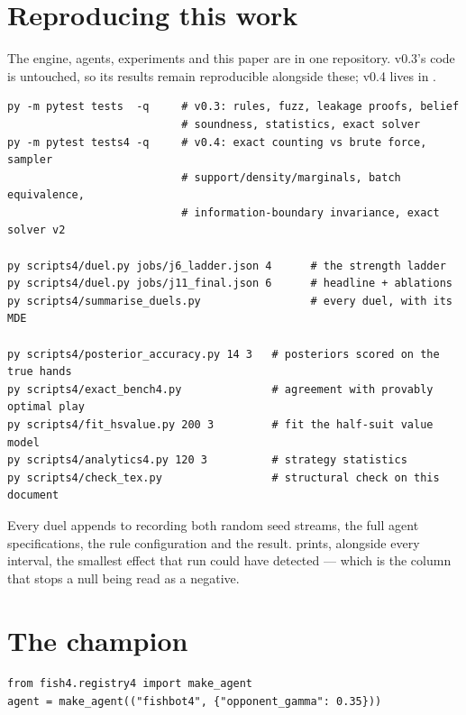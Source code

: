 \documentclass[11pt,a4paper]{article}
\begin{document}
\appendix

\section{Reproducing this work}
\label{app:repro}

The engine, agents, experiments and this paper are in one repository. v0.3's
code is untouched, so its results remain reproducible alongside these; v0.4
lives in .

\begin{verbatim}
py -m pytest tests  -q     # v0.3: rules, fuzz, leakage proofs, belief
                           # soundness, statistics, exact solver
py -m pytest tests4 -q     # v0.4: exact counting vs brute force, sampler
                           # support/density/marginals, batch equivalence,
                           # information-boundary invariance, exact solver v2

py scripts4/duel.py jobs/j6_ladder.json 4      # the strength ladder
py scripts4/duel.py jobs/j11_final.json 6      # headline + ablations
py scripts4/summarise_duels.py                 # every duel, with its MDE

py scripts4/posterior_accuracy.py 14 3   # posteriors scored on the true hands
py scripts4/exact_bench4.py              # agreement with provably optimal play
py scripts4/fit_hsvalue.py 200 3         # fit the half-suit value model
py scripts4/analytics4.py 120 3          # strategy statistics
py scripts4/check_tex.py                 # structural check on this document
\end{verbatim}

Every duel appends to  recording both random
seed streams, the full agent specifications, the rule configuration and the
result.  prints, alongside every interval, the
smallest effect that run could have detected --- which is the column that stops
a null being read as a negative.

\section{The champion}
\label{app:champion}

\begin{verbatim}
from fish4.registry4 import make_agent
agent = make_agent(("fishbot4", {"opponent_gamma": 0.35}))
\end{verbatim}
\end{document}
